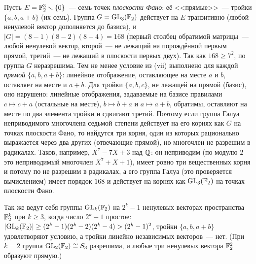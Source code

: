 \begin{example}
Пусть $E=\mathbb F_2^3\smallsetminus\{0\}$~--- семь точек \emph{плоскости Фано}; её <<прямые>>~--- тройки $\{a,b,a+b\}$ (их семь).
Группа $G=\mathrm{GL}_3(\mathbb F_2)$ действует на $E$ транзитивно (любой ненулевой вектор дополняется до базиса), и
$|G|=(8-1)(8-2)(8-4)=168$ (первый столбец обратимой матрицы~--- любой ненулевой вектор, второй~--- не лежащий на
порождённой первым прямой, третий~--- не лежащий в плоскости первых двух). Так как $168\ge7^2$, по  группа $G$
неразрешима. Тем не менее условие из (vii) выполнено для каждой \emph{прямой} $\{a,b,a+b\}$: линейное отображение,
оставляющее на месте $a$ и $b$, оставляет на месте и $a+b$. Для тройки $\{a,b,c\}$, не лежащей на прямой (базис), оно
нарушено: линейные отображения, задаваемые на базисе правилами $c\mapsto c+a$ (остальные на месте), $b\mapsto b+a$ и
$a\mapsto a+b$, обратимы, оставляют на месте по два элемента тройки и сдвигают третий. Поэтому если группа Галуа
неприводимого многочлена седьмой степени действует на его корнях как $G$ на точках плоскости Фано, то найдутся три корня,
один из которых рационально выражается через два других (отвечающие прямой), но многочлен не разрешим в радикалах.
Таков, например, $X^7-7X+3$ над $\mathbb Q$: он неприводим (по модулю $2$ это неприводимый многочлен $X^7+X+1$), имеет ровно
три вещественных корня и потому по  не разрешим в радикалах, а его группа Галуа (это проверяется
вычислением) имеет порядок $168$ и действует на корнях как $\mathrm{GL}_3(\mathbb F_2)$ на точках плоскости Фано.

Так же ведут себя группы $\mathrm{GL}_k(\mathbb F_2)$ на $2^k-1$ ненулевых векторах пространства $\mathbb F_2^k$ при $k\ge3$, когда
число $2^k-1$ простое: $|\mathrm{GL}_k(\mathbb F_2)|\ge(2^k-1)(2^k-2)(2^k-4)>(2^k-1)^2$, тройки $\{a,b,a+b\}$ удовлетворяют
условию, а тройки линейно независимых векторов~--- нет. (При $k=2$ группа $\mathrm{GL}_2(\mathbb F_2)\cong S_3$ разрешима, и
любые три ненулевых вектора $\mathbb F_2^2$ образуют прямую.)
\end{example}

